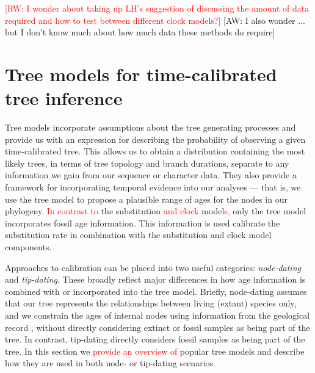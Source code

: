 \documentclass[11pt]{article}
\newcommand{\rw}[1]{{\textcolor{red}{[RW: #1]}}} %
\newcommand{\edit}[1]{{\textcolor{red}{#1}}} %
\newcommand{\aw}[1]{{\textcolor{armygreen}{[AW: #1]}}} %
\begin{document}
\rw{I wonder about taking up LH's suggestion of discussing the amount of data required and how to test between different clock models?} \aw{I also wonder ... but I don't know much about how much data these methods do require}

\section{Tree models for time-calibrated tree inference}


Tree models  incorporate assumptions about the tree generating processes and provide us with an expression for describing the probability of observing a given time-calibrated tree. This allows us to obtain a distribution containing the most likely trees, in terms of tree topology and branch durations, separate to any information we gain from our sequence or character data.
They also provide a framework for incorporating temporal evidence into our analyses --- that is, we use the tree model to propose a plausible range of ages for the nodes in our phylogeny.
 \edit{In contrast to} the substitution \edit{and clock} model\edit{s,}  only the tree model incorporates fossil age information.
This information is used calibrate the substitution rate in combination with the substitution and clock model components. %

Approaches to calibration can be placed into two useful categories: \textit{node-dating} and \textit{tip-dating}. 
These broadly reflect major differences in how age information is combined with or incorporated into the tree model.
Briefly, node-dating assumes that our tree represents the relationships between living (extant) species only, and we constrain the ages of internal nodes using information from the geological record%
, without directly considering extinct or fossil samples as being part of the tree.
In contrast, tip-dating directly considers fossil samples as being part of the tree.
In this section we  \edit{provide an overview of} popular tree models  and describe how they are used in both node- or tip-dating scenarios.
\end{document}
